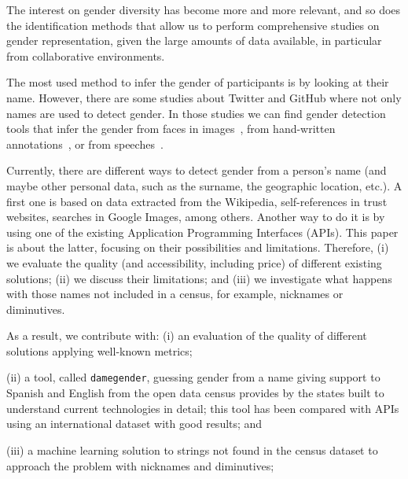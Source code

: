\documentclass[a4paper]{article}
\begin{document}
The interest on gender diversity has become more and more relevant, and so does the identification methods that allow us to perform comprehensive studies on gender representation, given the large amounts of data available, in particular from collaborative environments.

The most used method to infer the gender of participants is by looking at their name.
However, there are some studies about Twitter and GitHub where not only names are used to detect gender. 
In those studies we can find gender detection tools that infer the gender from faces in images~\cite{ranjan2017hyperface}, from hand-written annotations~\cite{liwicki2011automatic}, or from speeches~\cite{koppel2002automatically}.

Currently, there are different ways to detect gender from a person's name (and maybe other personal data, such as the surname, the geographic location, etc.).
A first one is based on data extracted from the Wikipedia, self-references in trust websites, searches in Google Images, among others.
Another way to do it is by using one of the existing Application Programming Interfaces (APIs).
This paper is about the latter, focusing on their possibilities and limitations.
Therefore, (i) we evaluate the quality (and accessibility, including price) of different existing solutions;
(ii) we discuss their limitations; and
(iii) we investigate what happens with those names not included in a census, for example, nicknames or diminutives.

As a result, we contribute with: 
(i) an evaluation of the quality of different solutions applying well-known metrics;

(ii) a tool, called \texttt{damegender}, guessing gender from a name
  giving support to Spanish and English from the open data census
  provides by the states built to understand current technologies in
  detail; this tool has been compared with APIs using an international
  dataset with good results; and
  
(iii) a machine learning solution to strings not found in the census
  dataset to approach the problem with nicknames and diminutives;
  
\end{document}
